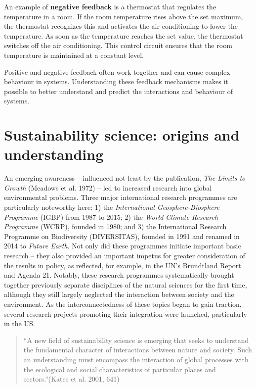\documentclass[
  a4paper,
  openany]{book}
\begin{document}
An example of \textbf{negative feedback} is a thermostat that regulates
the temperature in a room. If the room temperature rises above the set
maximum, the thermostat recognizes this and activates the air
conditioning to lower the temperature. As soon as the temperature
reaches the set value, the thermostat switches off the air conditioning.
This control circuit ensures that the room temperature is maintained at
a constant level.

Positive and negative feedback often work together and can cause complex
behaviour in systems. Understanding these feedback mechanisms makes it
possible to better understand and predict the interactions and behaviour
of systems.

\section{Sustainability science: origins and
understanding}\label{sustainability-science-origins-and-understanding}

An emerging awareness -- influenced not least by the publication,
\emph{The Limits to Growth} (Meadows et al. 1972) -- led to increased
research into global environmental problems. Three major international
research programmes are particularly noteworthy here: 1) the
\emph{International Geosphere-Biosphere Programme} (IGBP) from 1987 to
2015; 2) the \emph{World Climate Research Programme} (WCRP), founded in
1980; and 3) the International Research Programme on Biodiversity
(DIVERSITAS), founded in 1991 and renamed in 2014 to \emph{Future
Earth}. Not only did these programmes initiate important basic research
-- they also provided an important impetus for greater consideration of
the results in policy, as reflected, for example, in the UN's Brundtland
Report and Agenda 21. Notably, these research programmes systematically
brought together previously separate disciplines of the natural sciences
for the first time, although they still largely neglected the
interaction between society and the environment. As the
interconnectedness of these topics began to gain traction, several
research projects promoting their integration were launched,
particularly in the US.

\begin{quote}
``A new field of sustainability science is emerging that seeks to
understand the fundamental character of interactions between nature and
society. Such an understanding must encompass the interaction of global
processes with the ecological and social characteristics of particular
places and sectors.''(Kates et al. 2001, 641)
\end{quote}
\end{document}
